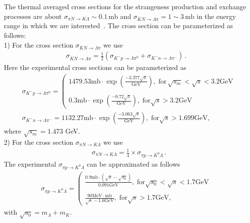 The thermal averaged cross sections for the strangeness production and exchange processes are about $\sigma_{\pi N\rightarrow K\Lambda}\sim0.1\,\mathrm{mb}$ and $\sigma_{\overline{K}N\rightarrow \Lambda\pi}=1\sim3\,\mathrm{mb}$ in the energy range in which we are interested~\cite{Koch:1986ud}. The cross section can be parameterized as follows:\\
1) For the cross section $\sigma_{\overline{K}N\rightarrow \Lambda\pi}$ we use~\cite{Koch:1986ud}
 \begin{align}
 \sigma_{\overline{K}N\rightarrow \Lambda\pi}=\frac{1}{2}\left(\sigma_{K^-p\rightarrow \Lambda\pi^0}+\sigma_{K^-n\rightarrow \Lambda\pi^-}\right)\,.
\end{align}
Here the experimental cross sections can be parameterized as 
\begin{align}
&\sigma_{K^-p\rightarrow \Lambda\pi^0}\!\!=\!\!\left(\begin{array}{l}\!\!1479.53\mathrm{mb}\!\cdot\!\exp{\left(\frac{-3.377\sqrt{s}}{\mathrm{GeV}}\right)},\; \mathrm{for}\,\sqrt{s_m}\!\!<\!\!\sqrt{s}\!<\!3.2\mathrm{GeV} \\ \\0.3\mathrm{mb}\!\cdot\!\exp{\left(\frac{-0.72\sqrt{s}}{\mathrm{GeV}}\right)},\; \mathrm{for}\sqrt{s}>3.2\mathrm{GeV}\end{array}\right.\\
&\sigma_{K^-n\rightarrow \Lambda\pi^-}\!\!=\!\!1132.27\mathrm{mb}\!\cdot\!\exp{\left(\frac{-3.063\sqrt{s}}{\mathrm{GeV}}\right)},\; \mathrm{for}\sqrt{s}>1.699\mathrm{GeV},
\end{align}
where $\sqrt{s_m}=1.473$ GeV.\\
2) For the cross section $\sigma_{\pi N\rightarrow K\Lambda}$ we use~\cite{Cugnon:1984pm}
\begin{align}
&\sigma_{\pi N\rightarrow K\Lambda}=\frac{1}{4}\times\sigma_{\pi p\rightarrow K^0\Lambda}\,.
\end{align}
The experimental $\sigma_{\pi p\rightarrow K^0\Lambda}$  can be approximated as follows
\begin{align}
\sigma_{\pi p\rightarrow K^0\Lambda}=\left(\begin{array}{l}\frac{0.9\mathrm{mb}\cdot\left(\sqrt{s}-\sqrt{s_0}\right)}{0.091\mathrm{GeV}},\; \mathrm{for} \sqrt{s_0}<\sqrt{s}<1.7\mathrm{GeV} \\ \\ \frac{90\mathrm{MeV\cdot mb}}{\sqrt{s}-1.6\mathrm{GeV}},\; \mathrm{for}\sqrt{s}>1.7\mathrm{GeV},\end{array}\right.
 \end{align}
 with $ \sqrt{s_0}=m_\Lambda+m_K$. 

